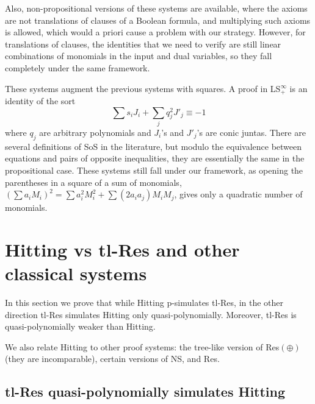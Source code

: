 \documentclass[11pt]{article}
\newcommand{\scterm}[1]{{\textrm{\sc #1}}}
\newcommand{\hit}{\scterm{Hitting}}
\newcommand{\tres}{\scterm{tl-Res}}
\newcommand{\res}{\scterm{Res}}
\newcommand{\resp}{{\res}$(\oplus)$}
\newcommand{\ns}{\scterm{NS}}
\newcommand{\ls}{\scterm{LS}}
\newcommand{\sos}{\scterm{SoS}}
\numberwithin{equation}{section}
\begin{document}
\begin{description}
Also, non-propositional versions of these systems are available, where the axioms are not translations of clauses of a Boolean formula, and multiplying such axioms is allowed, which would a priori cause a problem with our strategy. However, for translations of clauses, the identities that we need to verify are still linear combinations of monomials in the input and dual variables, so they fall completely under the same framework.

\item[Static {\ls}$_+^{\infty}$, {\sos}.] These systems augment the previous systems with squares.
A proof in {\ls}$_+^{\infty}$ is an identity of the sort
\[\sum s_i J_i + \sum_j q_j^2 J'_j\equiv -1\]
where $q_j$ are arbitrary polynomials and $J_i$'s and $J'_j$'s are conic juntas.
There are several definitions of {\sos} in the literature,
but modulo the equivalence between equations and pairs of opposite inequalities,
they are essentially the same in the propositional case.
These systems still fall under our framework, 
as opening the parentheses in a square of a sum of monomials,
$(\sum a_iM_i)^2 = \sum a_i^2M_i^2 + \sum (2a_ia_j)M_iM_j$,
gives only a quadratic number of monomials.
\end{description}
%


\section{\texorpdfstring{{\hit}}{Hitting} vs \texorpdfstring{{\tres}}{tl-Res} and other classical systems}

In this section we prove that while {\hit} p-simulates {\tres},
in the other direction {\tres} simulates {\hit} only quasi-polynomially.
Moreover, {\tres} is quasi-polynomially weaker than {\hit}.

We also relate {\hit} to other proof systems:
the tree-like version of {\resp} (they are incomparable),
certain versions of {\ns}, and {\res}.

\subsection{\texorpdfstring{{\tres}}{tl-Res} quasi-polynomially simulates \texorpdfstring{{\hit}}{Hitting}}
\end{document}
